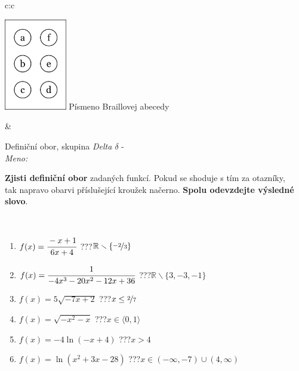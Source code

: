 \documentclass[10pt]{report}
\begin{document}
\begin{tabular}{c:c}
\begin{minipage}[c][104.5mm][t]{0.5\linewidth}
\begin{center}
\begin{minipage}{0.20\linewidth}
\begin{center}
\includegraphics[height=40mm]{../images/braille.png}
{\small Písmeno Braillovej abecedy}
\end{center}
\end{minipage}
\end{center}
\end{minipage}
&
\begin{minipage}[c][104.5mm][t]{0.5\linewidth}
\begin{center}
\vspace{7mm}
{\huge Definiční obor, skupina \textit{Delta $\delta$} -}\\[5mm]
\textit{Meno:}\phantom{xxxxxxxxxxxxxxxxxxxxxxxxxxxxxxxxxxxxxxxxxxxxxxxxxxxxxxxxxxxxxxxxx}\\[5mm]
\begin{minipage}{0.95\linewidth}
\textbf{Zjisti definiční obor} zadaných funkcí. Pokud se shoduje s tím za otazníky,\\tak napravo obarvi příslušející kroužek načerno. \textbf{Spolu odevzdejte výsledné slovo}.
\end{minipage}
\\[1mm]
\begin{minipage}{0.79\linewidth}
\begin{center}
\begin{varwidth}{\linewidth}
\begin{enumerate}
\normalsizerrr
\item $f(x)=\cfrac{-x+1}{6x+4}$\quad \dotfill\; ???\;\dotfill \quad $\mathbb{R}\smallsetminus\{\nicefrac{-2}{3}\}$
\item $f(x)=\cfrac{1}{-4x^3-20x^2-12x+36}$\quad \dotfill\; ???\;\dotfill \quad $\mathbb{R}\smallsetminus\{3,-3,-1\}$
\item $f(x)=5\sqrt{-7x+2}$\quad \dotfill\; ???\;\dotfill \quad $x\leq\nicefrac{2}{7}$
\item $f(x)=\sqrt{-x^2-x}$\quad \dotfill\; ???\;\dotfill \quad $x\in\langle0 , 1\rangle$
\item $f(x)=-4\ln{(-x+4)}$\quad \dotfill\; ???\;\dotfill \quad $x>4$
\item $f(x)=\ln{(x^2+3x-28)}$\quad \dotfill\; ???\;\dotfill \quad $x\in(-\infty , -7)\cup(4 , \infty)$

\end{enumerate}
\end{varwidth}
\end{center}
\end{minipage}
\end{center}
\end{minipage}
\end{tabular}
\end{document}
